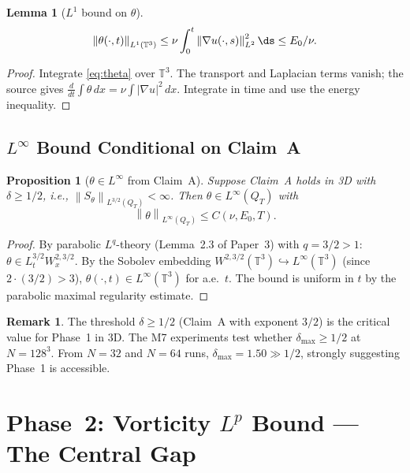 \documentclass[11pt]{article}
\newtheorem{proposition}[theorem]{Proposition}
\newtheorem{lemma}[theorem]{Lemma}
\theoremstyle{definition}
\newtheorem{remark}[theorem]{Remark}
\theoremstyle{remark}
\newcommand{\T}{\mathbb{T}}
\newcommand{\dx}{\,dx}
\newcommand{\norm}[1]{\left\|#1\right\|}
\newcommand{\grad}{\nabla}
\begin{document}
\begin{lemma}[$L^1$ bound on $\theta$]\label{lem:theta-L1}
  \begin{equation}
    \norm{\theta(\cdot,t)}_{L^1(\T^3)}
    \leq \nu\int_0^t\norm{\grad u(\cdot,s)}^2_{L^2}\ds
    \leq E_0/\nu.
  \end{equation}
\end{lemma}

\begin{proof}
  Integrate \eqref{eq:theta} over $\T^3$.  The transport and Laplacian
  terms vanish; the source gives $\frac{d}{dt}\int\theta\dx = \nu\int|\grad u|^2\dx$.
  Integrate in time and use the energy inequality.
\end{proof}

\subsection{$L^\infty$ Bound Conditional on Claim~A}

\begin{proposition}[$\theta\in L^\infty$ from Claim~A]\label{prop:theta-Linfty}
  Suppose Claim~A holds in 3D with $\delta\geq 1/2$, i.e.,
  $\norm{S_\theta}_{L^{3/2}(Q_T)}<\infty$.  Then $\theta\in L^\infty(Q_T)$
  with
  \begin{equation}
    \norm{\theta}_{L^\infty(Q_T)} \leq C(\nu,E_0,T).
  \end{equation}
\end{proposition}

\begin{proof}
  By parabolic $L^q$-theory (Lemma~2.3 of Paper~3) with $q=3/2>1$:
  $\theta\in L^{3/2}_t W^{2,3/2}_x$.  By the Sobolev embedding
  $W^{2,3/2}(\T^3)\hookrightarrow L^\infty(\T^3)$ (since $2\cdot(3/2)>3$),
  $\theta(\cdot,t)\in L^\infty(\T^3)$ for a.e.~$t$.  The bound is uniform
  in $t$ by the parabolic maximal regularity estimate.
\end{proof}

\begin{remark}
  The threshold $\delta\geq 1/2$ (Claim~A with exponent $3/2$) is the
  critical value for Phase~1 in 3D.  The M7 experiments test whether
  $\delta_{\max}\geq 1/2$ at $N=128^3$.  From $N=32$ and $N=64$ runs,
  $\delta_{\max}=1.50\gg 1/2$, strongly suggesting Phase~1 is accessible.
\end{remark}

\section{Phase~2: Vorticity $L^p$ Bound — The Central Gap}
\label{sec:gap}
\end{document}
